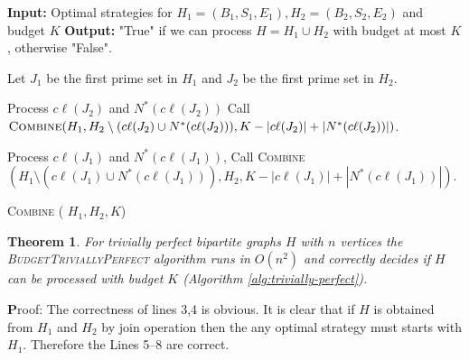 \documentclass[letterpaper,11pt,abstracton]{scrartcl}
\newcommand{\pf}{{\textbf Proof: }}
\newtheorem{tm}[theorem]{Theorem}
\begin{document}
\begin{algorithm}[H]
\begin{algorithmic}[1]
\State \textbf{Input:} Optimal strategies for $H_1=(B_1,S_1,E_1), H_2=(B_2,S_2,E_2)$ and budget $K$\;
\State \textbf{Output:} "True" if we can process $H=H_1\cup H_2$ with budget at most $K$, otherwise "False".\;

\State Let $J_1$ be the first prime set in $H_1$ and $J_2$ be the first prime set in $H_2$.

	\State Process $c\ell(J_2)$ and $N^*(c\ell(J_2))$
       \State Call $\textsc{Combine} (H_1, H_2 \setminus (c\ell(J_2) \cup N^*(c\ell(J_2))), K-|c\ell(J_2)|+|N^*	(c\ell(J_2))| ) $.


\Else{}  \State Process $ c\ell(J_1)$ and $N^*(c\ell(J_1))$,
         \State Call \textsc{Combine} $(H_1\setminus (c\ell(J_1) \cup N^*(c\ell(J_1))), H_2, K-|c\ell(J_1)|+|N^*(c\ell(J_1))| ) $.

\EndIf

\end{algorithmic}
\caption{{\textsc{Combine}} ( $H_1,H_2, K$)}
\label{combine}
\end{algorithm}

\begin{tm}\label{thm:poly-TP-CB}
  For trivially perfect bipartite graphs $H$ with $n$ vertices the \textsc{BudgetTriviallyPerfect} algorithm runs in
  $O(n^2)$ and correctly decides if $H$ can be processed with budget $K$ (Algorithm \ref{alg:trivially-perfect}).
\end{tm}
\pf The correctness of lines 3,4 is obvious. It is clear that if $H$ is obtained from $H_1$ and $H_2$ by join operation then 
the any optimal strategy must starts with $H_1$.
Therefore the Lines 5--8 are correct.
\end{document}
